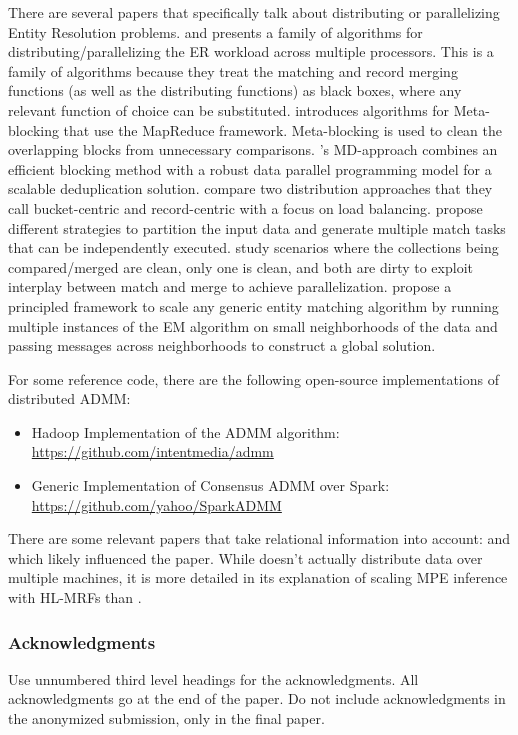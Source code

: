 \documentclass{article}
\begin{document}
There are several papers that specifically talk about distributing or parallelizing Entity Resolution problems. \cite{benjelloun2007d} and \cite{kawai2006p} presents a family of algorithms for distributing/parallelizing the ER workload across multiple processors. This is a family of algorithms because they treat the matching and record merging functions (as well as the distributing functions) as black boxes, where any relevant function of choice can be substituted. \cite{efthymiou2017parallel} introduces algorithms for Meta-blocking that use the MapReduce framework. Meta-blocking is used to clean the overlapping blocks from unnecessary comparisons. \cite{dal2011fast}'s MD-approach combines an efficient blocking method with a robust data parallel programming model for a scalable deduplication solution. \cite{malhotra2014graph} compare two distribution approaches that they call bucket-centric and record-centric with a focus on load balancing. \cite{kirsten2010data} propose different strategies to partition the input data and generate multiple match tasks that can be independently executed. \cite{kim2007parallel} study scenarios where the collections being compared/merged are clean, only one is clean, and both are dirty to exploit interplay between match and merge to achieve parallelization. \cite{rastogi2011large} propose a principled framework to scale any generic entity matching algorithm by running multiple instances of the EM algorithm on small neighborhoods of the data and passing messages across neighborhoods to construct a global solution.

For some reference code, there are the following open-source implementations of distributed ADMM:
\begin{itemize}
    \item Hadoop Implementation of the ADMM algorithm: \url{https://github.com/intentmedia/admm}
    \item Generic Implementation of Consensus ADMM over Spark: \url{https://github.com/yahoo/SparkADMM}
\end{itemize}

There are some relevant papers that take relational information into account: \cite{Martins:2011:DDM:2145432.2145460} and \cite{aguiar2011augmented} which likely influenced the \cite{bach2012scaling} paper. While \cite{bach2012scaling} doesn't actually distribute data over multiple machines, it is more detailed in its explanation of scaling MPE inference with HL-MRFs than \cite{bach2015hinge}.

\subsubsection*{Acknowledgments}

Use unnumbered third level headings for the acknowledgments. All acknowledgments go at the end of the paper. Do not include acknowledgments in the anonymized submission, only in the final paper.

 

\end{document}
